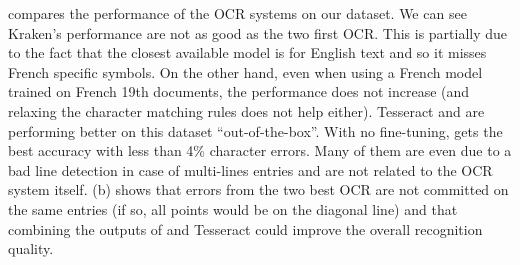 %
 compares the performance of the OCR systems on our dataset. We can see Kraken's performance are
not as good as the two first OCR. This is partially due to the fact that the closest available model is for English text
and so it misses French specific symbols. On the other hand, even when using a French model trained on French 19th
documents, the performance does not increase (and relaxing the character matching rules does not help either). Tesseract and
\peroocr are performing better on this dataset ``out-of-the-box''. With no fine-tuning, \peroocr gets the best accuracy
with less than 4\% character errors. Many of them are even due to a bad line detection in case of multi-lines entries
and are not related to the OCR system itself.  (b) shows that errors from the two best OCR are not
committed on the same entries (if so, all points would be on the diagonal line) and that combining the outputs of
\peroocr and Tesseract could improve the overall recognition quality. 

